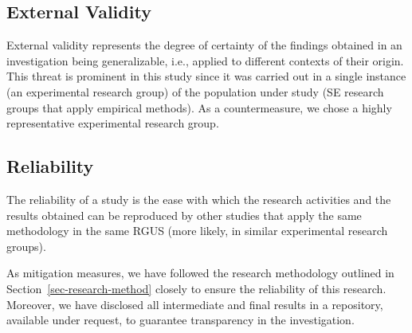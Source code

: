 \subsection{External Validity}
External validity represents the degree of certainty of the findings obtained in an investigation being generalizable, i.e., applied to different contexts of their origin. This threat is prominent in this study since it was carried out in a single instance (an experimental research group) of the population under study (SE research groups that apply empirical methods). As a countermeasure, we chose a highly representative experimental research group.

\subsection{Reliability}
The reliability of a study is the ease with which the research activities and the results obtained can be reproduced by other studies that apply the same methodology in the same RGUS (more likely, in similar experimental research groups). 

As mitigation measures, we have followed the research methodology outlined in Section~\ref{sec-research-method} closely to ensure the reliability of this research. Moreover, we have disclosed all intermediate and final results in a repository, available under request, to guarantee transparency in the investigation.